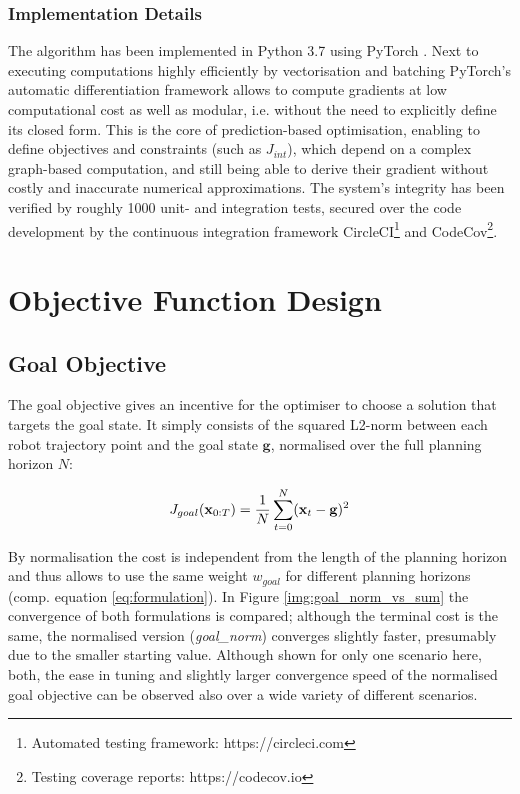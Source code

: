\subsubsection{Implementation Details} 
The algorithm has been implemented in Python 3.7 using PyTorch \cite{pytorch}. Next to executing computations highly efficiently by vectorisation and batching PyTorch's automatic differentiation framework allows to compute gradients at low computational cost as well as modular, i.e. without the need to explicitly define its closed form. This is the core of prediction-based optimisation, enabling to define objectives and constraints (such as $J_{int}$), which depend on a complex graph-based computation, and still being able to derive their gradient without  costly and inaccurate numerical approximations.
\newline
The system's integrity has been verified by roughly 1000 unit- and integration tests, secured over the code development by the continuous integration framework CircleCI\footnote{Automated testing framework: https://circleci.com} and CodeCov\footnote{Testing coverage reports: https://codecov.io}.

\section{Objective Function Design}
\label{text:approach/objective}

\subsection{Goal Objective}
\label{text:approach/objective/goal}
The goal objective gives an incentive for the optimiser to choose a solution that targets the goal state. It simply consists of the squared L2-norm between each robot trajectory point and the goal state $\mathbf{g}$, normalised over the full planning horizon $N$:

\begin{equation}
J_{goal}(\mathbf{x}_{0:T}) = \frac{1}{N} \sum_{t = 0}^N (\mathbf{x}_t - \mathbf{g})^2
\end{equation}

By normalisation the cost is independent from the length of the planning horizon and thus allows to use the same weight $w_{goal}$ for different planning horizons (comp. equation \ref{eq:formulation}). In Figure \ref{img:goal_norm_vs_sum} the convergence of both formulations is compared; although the terminal cost is the same, the normalised version (\textit{goal\_norm}) converges slightly faster, presumably due to the smaller starting value. Although shown for only one scenario here, both, the ease in tuning and slightly larger convergence speed of the normalised goal objective can be observed also over a wide variety of different scenarios.  

